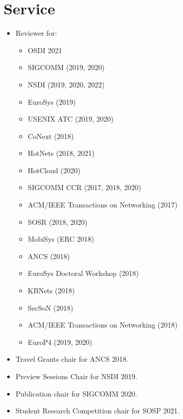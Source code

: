 \documentclass[11pt,letterpaper,sans]{moderncv}        %
\begin{document}
\section{Service}
    \begin{itemize}
        \item Reviewer for:
            \begin{itemize}
                \item OSDI 2021
                \item SIGCOMM (2019, 2020)
                \item NSDI (2019, 2020, 2022)
                \item EuroSys (2019)
                \item USENIX ATC (2019, 2020)
                \item CoNext (2018)
                \item HotNets (2018, 2021)
                \item HotCloud (2020)
                \item SIGCOMM CCR (2017, 2018, 2020)
                \item ACM/IEEE Transactions on Networking (2017)
                \item SOSR (2018, 2020)
                \item MobiSys (ERC 2018)
                \item ANCS (2018)
                \item EuroSys Doctoral Workshop (2018)
                \item KBNets (2018)
                \item SecSoN (2018)
                \item ACM/IEEE Transactions on Networking (2018)
                \item EuroP4 (2019, 2020)
            \end{itemize}
        \item Travel Grants chair for ANCS 2018.
        \item Preview Sessions Chair for NSDI 2019.
        \item Publication chair for SIGCOMM 2020. 
        \item Student Research Competition chair for SOSP 2021. 
    \end{itemize}
\end{document}
